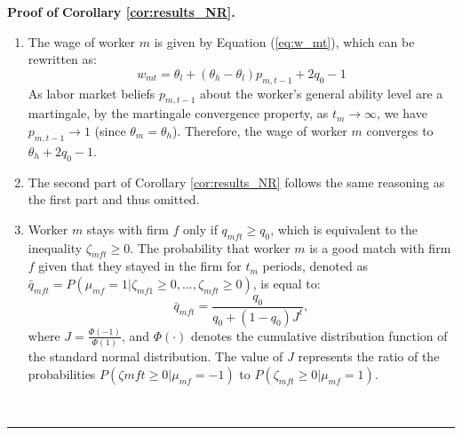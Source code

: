 \documentclass[12pt]{article}
\newenvironment{proof}[1][Proof of]{\noindent\textbf{#1} }{\ \rule{0.5em}{0.5em}}
\begin{document}
\begin{proof}
    \textbf{Corollary \ref{cor:results_NR}.}
    \begin{enumerate}[label={\roman*})]
        \item The wage of worker $m$ is given by Equation (\ref{eq:w_mt}), which can be rewritten as:
            \begin{equation*}
                w_{mt} = \theta_l + (\theta_h - \theta_l)p_{m,t-1} + 2q_0 - 1
            \end{equation*}
        As labor market beliefs $p_{m,t-1}$ about the worker's general ability level are a martingale, by the martingale convergence property, as $t_m \rightarrow \infty$, we have $p_{m,t-1} \rightarrow 1$ (since $\theta_m = \theta_h$). Therefore, the wage of worker $m$ converges to $\theta_h + 2q_0 - 1$.
        \item The second part of Corollary \ref{cor:results_NR} follows the same reasoning as the first part and thus omitted.

        \item Worker $m$ stays with firm $f$ only if $q_{mft} \geq q_0$, which is equivalent to the inequality $\zeta_{mft} \geq 0$. The probability that worker $m$ is a good match with firm $f$ given that they stayed in the firm for $t_m$ periods, denoted as $\bar{q}_{mft} = P(\mu_{mf} =1 | \zeta_{mf1} \geq 0, ... , \zeta_{mft} \geq 0)$, is equal to:
            \begin{equation*}
                \bar{q}_{mft} = \frac{q_0}{q_0 + (1-q_0)J^t},
            \end{equation*}
        where $J = \frac{\Phi(-1)}{\Phi(1)}$, and $\Phi(\cdot)$ denotes the cumulative distribution function of the standard normal distribution. The value of $J$ represents the ratio of the probabilities $P(\zeta{mft}\geq 0 | \mu_{mf} = -1)$ to $P(\zeta_{mft}\geq 0 | \mu_{mf} = 1)$.


\end{enumerate}
\end{proof}
\end{document}
